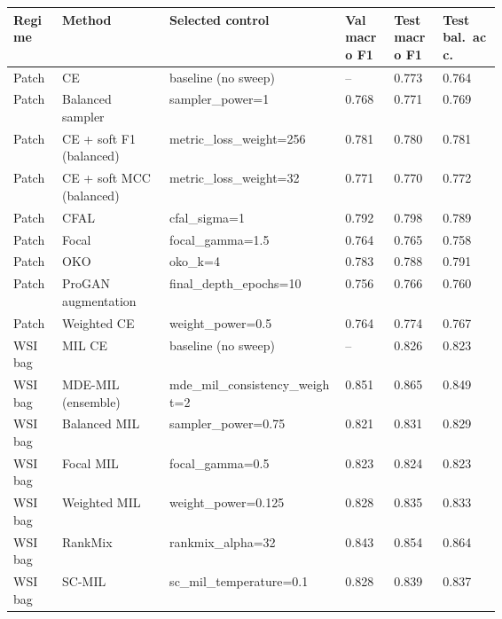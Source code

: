 \begin{tabularx}{\linewidth}{@{}>{\raggedright\arraybackslash}p{0.10\linewidth}>{\raggedright\arraybackslash}p{0.22\linewidth}>{\raggedright\arraybackslash}X>{\centering\arraybackslash}p{0.10\linewidth}>{\centering\arraybackslash}p{0.10\linewidth}>{\centering\arraybackslash}p{0.12\linewidth}@{}}
\toprule
Regime & Method & Selected control & Val macro F1 & Test macro F1 & Test bal.\ acc.\\
\midrule
Patch & CE & baseline (no sweep) & -- & \num{0.773} & \num{0.764}\\
Patch & Balanced sampler & sampler\_power=1 & \num{0.768} & \num{0.771} & \num{0.769}\\
Patch & CE + soft F1 (balanced) & metric\_loss\_weight=256 & \num{0.781} & \num{0.780} & \num{0.781}\\
Patch & CE + soft MCC (balanced) & metric\_loss\_weight=32 & \num{0.771} & \num{0.770} & \num{0.772}\\
Patch & CFAL & cfal\_sigma=1 & \num{0.792} & \num{0.798} & \num{0.789}\\
Patch & Focal & focal\_gamma=1.5 & \num{0.764} & \num{0.765} & \num{0.758}\\
Patch & OKO & oko\_k=4 & \num{0.783} & \num{0.788} & \num{0.791}\\
Patch & ProGAN augmentation & final\_depth\_epochs=10 & \num{0.756} & \num{0.766} & \num{0.760}\\
Patch & Weighted CE & weight\_power=0.5 & \num{0.764} & \num{0.774} & \num{0.767}\\
WSI bag & MIL CE & baseline (no sweep) & -- & \num{0.826} & \num{0.823}\\
WSI bag & MDE-MIL (ensemble) & mde\_mil\_consistency\_weight=2 & \num{0.851} & \num{0.865} & \num{0.849}\\
WSI bag & Balanced MIL & sampler\_power=0.75 & \num{0.821} & \num{0.831} & \num{0.829}\\
WSI bag & Focal MIL & focal\_gamma=0.5 & \num{0.823} & \num{0.824} & \num{0.823}\\
WSI bag & Weighted MIL & weight\_power=0.125 & \num{0.828} & \num{0.835} & \num{0.833}\\
WSI bag & RankMix & rankmix\_alpha=32 & \num{0.843} & \num{0.854} & \num{0.864}\\
WSI bag & SC-MIL & sc\_mil\_temperature=0.1 & \num{0.828} & \num{0.839} & \num{0.837}\\
\bottomrule
\end{tabularx}
